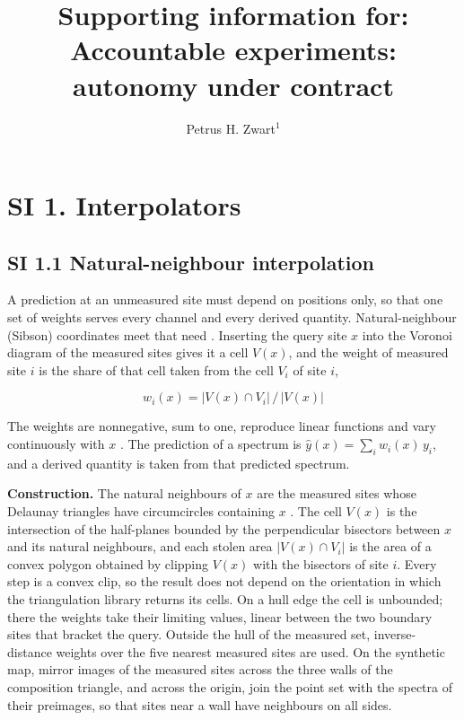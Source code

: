 \documentclass{iopjournal}
\begin{document}

\title{Supporting information for: Accountable experiments: autonomy under contract}

\author{Petrus H. Zwart$^{1}$}


\hypertarget{si-1.-interpolators}{%
\section*{SI 1. Interpolators}\label{si-1.-interpolators}}

\hypertarget{si-1.1-natural-neighbour-interpolation}{%
\subsection*{SI 1.1 Natural-neighbour interpolation}\label{si-1.1-natural-neighbour-interpolation}}

A prediction at an unmeasured site must depend on positions only, so that one set of weights serves every channel and every derived quantity. Natural-neighbour (Sibson) coordinates meet that need \cite{Sibson1981}. Inserting the query site \(x\) into the Voronoi diagram of the measured sites gives it a cell \(V(x)\), and the weight of measured site \(i\) is the share of that cell taken from the cell \(V_i\) of site \(i\),

\[
w_i(x) = |V(x) \cap V_i| \, / \, |V(x)|
\]

The weights are nonnegative, sum to one, reproduce linear functions and vary continuously with \(x\) \cite{Sibson1981}. The prediction of a spectrum is \(\hat y(x) = \sum_i w_i(x) \, y_i\), and a derived quantity is taken from that predicted spectrum.

\textbf{Construction.} The natural neighbours of \(x\) are the measured sites whose Delaunay triangles have circumcircles containing \(x\) \cite{Watson1992}. The cell \(V(x)\) is the intersection of the half-planes bounded by the perpendicular bisectors between \(x\) and its natural neighbours, and each stolen area \(|V(x) \cap V_i|\) is the area of a convex polygon obtained by clipping \(V(x)\) with the bisectors of site \(i\). Every step is a convex clip, so the result does not depend on the orientation in which the triangulation library returns its cells. On a hull edge the cell is unbounded; there the weights take their limiting values, linear between the two boundary sites that bracket the query. Outside the hull of the measured set, inverse-distance weights over the five nearest measured sites are used. On the synthetic map, mirror images of the measured sites across the three walls of the composition triangle, and across the origin, join the point set with the spectra of their preimages, so that sites near a wall have neighbours on all sides.
\end{document}
